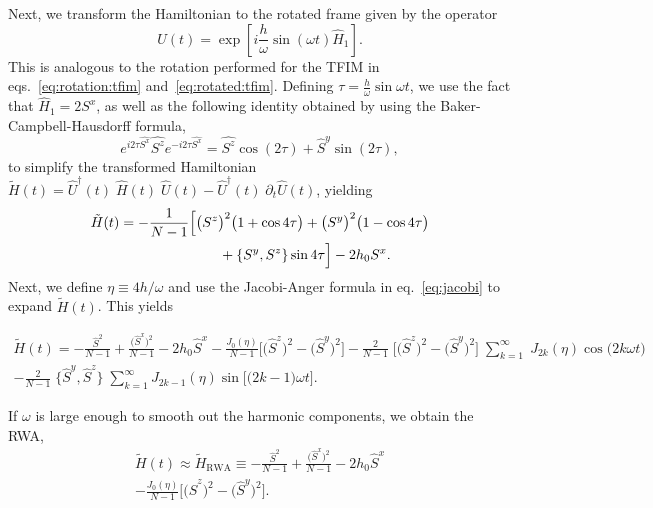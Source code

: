 \documentclass[%
reprint,
superscriptaddress,
amsmath,amssymb,
aps,
prb,
showkeys,
]{revtex4-2}
\begin{document}
Next, we transform the Hamiltonian to the rotated frame given by the operator
\begin{equation}
	\hat{U}(t)=\exp [i \frac{h}{\omega} \sin (\omega t) \hat{H}_{1}].
\end{equation}
This is analogous to the rotation performed for the TFIM in eqs.~\ref{eq:rotation:tfim} and~\ref{eq:rotated:tfim}. Defining $\tau = \displaystyle\frac{h}{\omega}\sin{\omega t}$, we use the fact that $\hat{H}_1 = 2 S^x$, as well as the following identity obtained by using the Baker-Campbell-Hausdorff formula,
\begin{equation}
	e^{i 2\tau\hat{S^{x}}} \hat{S^{z}} e^{-i 2\tau \hat{S^{x}}}=\hat{S^{z}} \cos \left(2\tau\right)+\hat{S}^{y} \sin (2\tau),
\end{equation}
to simplify the transformed Hamiltonian $\tilde{H}(t) = \hat{U}^\dagger(t)\;\hat{H}(t)\;\hat{U}(t) - \hat{U}^\dagger(t)\;\partial_t\hat{U}(t)$, yielding
\begin{align}
	\label{eq:lmg_rotated}
	\tilde{H}(t)& = -\frac{1}{N-1}\Big[\big(S^z\big)^2 \big(1+\cos{4\tau}\big)+ \big(S^y\big)^2 \big(1-\cos{4\tau}\big)\nonumber \\  
	&\hskip 2.5cm + \pb{S^y}{S^z}
	\sin{4\tau}\Big] - 2 h_0 S^x.
\end{align}
Next, we define $\eta\equiv 4h/\omega$ and use the Jacobi-Anger formula in eq.~\ref{eq:jacobi}
to expand $\tilde{H}(t)$. This yields
\begin{widetext}
	\begin{multline}
		\label{eq:lmg_jacobiexp}
		\tilde{H}(t)= -\frac{\hat{S}^2}{N-1} +  \frac{\big(\hat{S}^x\big)^{2}}{N-1} - 2h_0 \hat{S}^x - \frac{J_0(\eta)}{N-1}\bigg[\big(\hat{S}^z\big)^{2} - \big(\hat{S}^y\big)^{2} \bigg] - \frac{2}{N-1}\;\Big[\big( \hat{S}^z\big)^2 - \big( \hat{S}^y\big)^2\Big]\;\sum^\infty_{k=1}\;J_{2k}(\eta)\cos{\big(2k\omega t\big)}\\
		- \frac{2}{N-1}\;\big\{ \hat{S}^y,  \hat{S}^z \big\}\;\sum^\infty_{k=1}J_{2k-1}(\eta)  \sin{\Big[\big(2k-1\big)\omega t\Big]}.
	\end{multline}
\end{widetext}
If $\omega$ is large enough to smooth out the harmonic components, we obtain the RWA,
\begin{multline}
	\tilde{H}(t)\approx \tilde{H}_{\mathrm{RWA}}\equiv -\frac{\hat{S}^2}{N-1} +  \frac{\big(\hat{S}^x\big)^{2}}{N-1} - 2h_0 \hat{S}^x\\
	- \frac{J_0(\eta)}{N-1}\bigg[\big(\hat{S}^z\big)^{2} - \big(\hat{S}^y\big)^{2} \bigg].
	\label{eq:lmg_rwa}
\end{multline}
\end{document}
